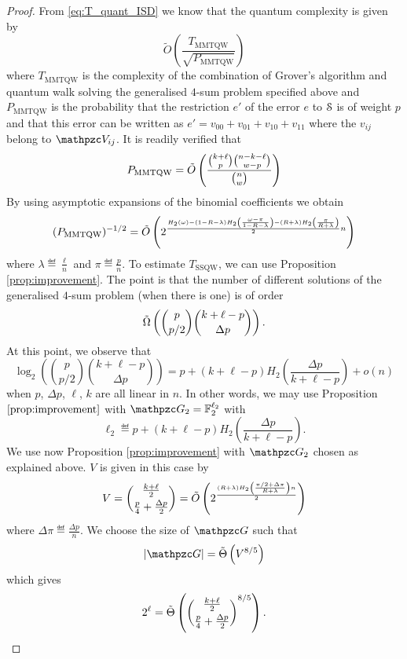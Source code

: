 \begin{proof}
From \eqref{eq:T_quant_ISD} we  know that the quantum complexity is given by
\begin{equation}
\label{eq:complexityMMTQW}
\tilde O\left(\frac{T_{\text{MMTQW}}}{\sqrt{P_{\text{MMTQW}}}}\right)
\end{equation}
where $T_{\text{MMTQW}}$ is the complexity of the combination of Grover's algorithm and quantum walk
solving the generalised $4$-sum problem specified above and $P_{\text{MMTQW}}$ is the probability
that the restriction $e'$ of the error $e$ to $\mathcal{S}$ is of weight $p$
and that this error can be written as $e' = v_{00}+v_{01}+v_{10} + v_{11}$ where the $v_{ij}$ belong to 
$\zV_{ij}$.
It is readily verified that 
$$
P_{\text{MMTQW}} = \tilde{O}\left( \frac{ \binom{k+\ell}{p} \binom{n-k-\ell}{w - p}}{\binom{n}{w}} \right)
$$
By using asymptotic expansions of the binomial coefficients we obtain
\begin{equation}
\label{eq:PMMTQW}
(P_{\text{MMTQW}})^{-1/2} = \tilde{O}\left( 2^{\frac{H_2(\omega) - (1-R-\lambda)H_2\left(\frac{\omega - \pi}{1 - R - \lambda}\right) - (R+\lambda)H_2\left(\frac{\pi}{R+\lambda}\right) }{2} n} \right)
\end{equation}
where $\lambda \eqdef \frac{\ell}{n}$ and $\pi \eqdef \frac{p}{n}$. To estimate $T_{\text{SSQW}}$, we can use Proposition \ref{prop:improvement}.
The point is that the number of different solutions of the generalised $4$-sum problem 
(when there is one) is of order 
$$
\tilde{\Omega} \left( \binom{p}{p/2} \binom{k+\ell-p}{\Delta p} \right).
$$
At this point, we observe that
$$
\log_2\left(\binom{p}{p/2} \binom{k+\ell-p}{\Delta p}\right) = p+ (k+\ell-p)H_2\left( \frac{\Delta p}{k+\ell -p} \right) +o(n)
$$
when $p$, $\Delta p$, $\ell$, $k$ are all linear in $n$.
In other words, we may use Proposition $\ref{prop:improvement}$ with 
$\zG_2 = \Ft^{\ell_2}$ with 
\begin{equation}
\label{eq:ell2}
\ell_2 \eqdef p+ (k+\ell-p)H_2\left( \frac{\Delta p}{k+\ell -p} \right).
\end{equation}
We use now Proposition \ref{prop:improvement}
with $\zG_2$ chosen as explained above. 
$V$ is given in this case by
$$
V = \binom{\frac{k+\ell}{2}}{\frac{p}{4}+\frac{\Delta p}{2}} = \tilde{O}\left( 2^{\frac{(R+\lambda) H_2\left(\frac{\pi/2 + \Delta \pi}{R + \lambda}\right)n}{2}} \right)
$$
where $\Delta \pi \eqdef \frac{\Delta p}{n}$.
We choose the size of $\zG$ such that
\begin{equation}\label{eq:G}
|\zG| = \Tht{V^{8/5}}
\end{equation}
which gives
$$
2^\ell = \tilde{\Theta}\left(   {\binom{\frac{k+\ell}{2}}{\frac{p}{4}+\frac{\Delta p}{2}}}^{8/5} \right).
$$
\end{proof}
